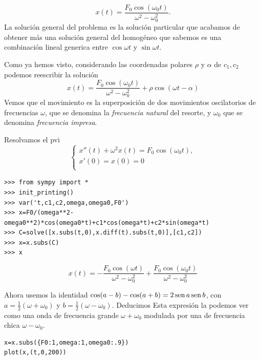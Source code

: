 \[x(t)=\frac{F_{0} \cos{\left (\omega_{0} t \right )}}{\omega^{2} - \omega_{0}^{2}}.
\]
La solución general del problema es la solución particular que acabamos de obtener más una solución
general del homogéneo que sabemos es una combinación lineal generica entre $\cos \omega t$ y $\sin \omega t$.

Como ya hemos visto, considerando las coordenadas polares $\rho$ y $\alpha$ de $c_1,c_2$
podemos reescribir la solución
\[x(t)=\frac{F_{0} \cos\left(\omega_{0} t\right)}{\omega^{2} - \omega_{0}^{2}}+
\rho\cos(\omega t-\alpha)
\]
Vemos que el movimiento es la superposición de dos movimientos oscilatorios de frecuencias $\omega$, que se
denomina la \emph{frecuencia natural} del resorte, y $\omega_0$ que se denomina \emph{frecuencia impresa}.




Resolvamos el pvi
\[
\left\{\begin{array}{l}
x''(t)+\omega^2x(t)=F_0\cos(\omega_0 t),\\
x'(0)=x(0)=0\\
\end{array}
\right.
\]

\begin{lstlisting}
>>> from sympy import *
>>> init_printing()
>>> var('t,c1,c2,omega,omega0,F0')
>>> x=F0/(omega**2-omega0**2)*cos(omega0*t)+c1*cos(omega*t)+c2*sin(omega*t)
>>> C=solve([x.subs(t,0),x.diff(t).subs(t,0)],[c1,c2])
>>> x=x.subs(C)
>>> x
\end{lstlisting}

\[x(t)=-\frac{F_{0} \cos\left(\omega t\right)}{\omega^{2} - \omega_{0}^{2}} + \frac{F_{0} \cos\left(\omega_{0} t\right)}{\omega^{2} - \omega_{0}^{2}}
\]

Ahora usemos la identidad $\cos(a-b)-\cos(a+b)=2\sen a\sen b$, con $a=\frac12 (\omega+\omega_0)$ y
$b=\frac12 (\omega-\omega_0)$. Deducimos
Esta expresión la podemos ver como una onda de frecuencia grande $\omega+\omega_0$ modulada por una de frecuencia
chica $\omega-\omega_0$.

\begin{lstlisting}
x=x.subs({F0:1,omega:1,omega0:.9})
plot(x,(t,0,200))
\end{lstlisting}

